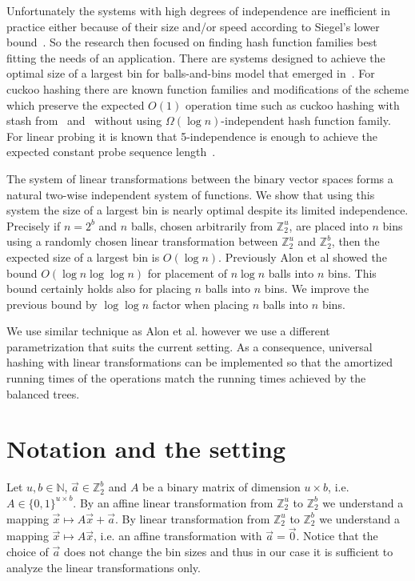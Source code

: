 \documentclass[unicode,review]{siamart1116}
\newcommand{\vecspace}[2]{\mathbb{Z}_{#1}^{#2}}
\newcommand{\binvecspace}[1]{\vecspace{2}{#1}}
\numberwithin{theorem}{section}
\begin{document}
Unfortunately the systems with high degrees of independence are inefficient in practice either because of their size and/or speed according to Siegel's lower bound~\cite{siegel}. 
So the research then focused on finding hash function families best fitting the needs of an application. 
There are systems designed to achieve the optimal size of a largest bin for balls-and-bins model that emerged in~\cite{celisetal}.
For cuckoo hashing there are known function families and modifications of the scheme which preserve the expected $O(1)$ operation time such as cuckoo hashing with stash from~\cite{mitzenmacher-cuckoo} and~\cite{dietzfelbinger-cuckoo} without using $\Omega(\log n)$-independent hash function family.
For linear probing it is known that 5-independence is enough to achieve the expected constant probe sequence length~\cite{linear-probing}.

The system of linear transformations between the binary vector spaces forms a natural two-wise independent system of functions.
We show that using this system the size of a largest bin is nearly optimal despite its limited independence.
 Precisely if $n = 2^b$ and $n$ balls, chosen arbitrarily from $\binvecspace{u}$, are placed into $n$ bins using a randomly chosen linear transformation between $\binvecspace{u}$ and $\binvecspace{b}$, then the expected size of a largest bin is $O(\log n)$.
Previously Alon et al \cite{alonetal} showed the bound $O(\log n \log \log n)$ for placement of $n \log n$ balls into $n$ bins.
This bound certainly holds also for placing $n$ balls into $n$ bins.
We improve the previous bound by $\log \log n$ factor when placing $n$ balls into $n$ bins.

We use similar technique as Alon et al. however we use a different parametrization that suits the current setting. 
As a consequence, universal hashing with linear transformations can be implemented so that the amortized running times of the operations match the running times achieved by the balanced trees.

\section{Notation and the setting}
Let $u, b \in \mathbb{N}$, $\vec{a} \in \binvecspace{b}$ and $A$ be a binary matrix of dimension $u \times b$, i.e. $A \in \{0, 1\}^{u \times b}$.
By an affine linear transformation from $\binvecspace{u}$ to $\binvecspace{b}$ we understand a mapping $\vec x \mapsto A\vec x + \vec{a}$.
By linear transformation from $\binvecspace{u}$ to $\binvecspace{b}$
we understand a mapping $\vec x \mapsto A\vec x$, i.e. an affine transformation with $\vec{a} = \vec{0}$.
Notice that the choice of $\vec{a}$ does not change the bin sizes and thus in our case it is sufficient to analyze the linear transformations only.
\end{document}
